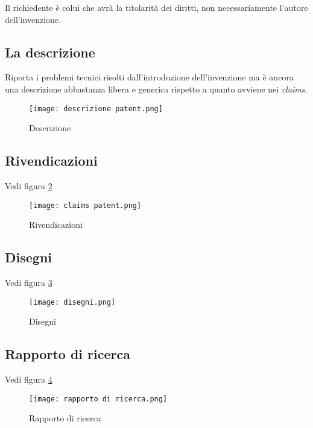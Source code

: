 Il richiedente è colui che avrà la titolarità dei diritti, non necessariamente l'autore dell'invenzione. 

\subsection{La descrizione}
Riporta i problemi tecnici risolti dall'introduzione dell'invenzione ma è ancora una descrizione abbastanza libera e generica rispetto a quanto avviene nei \textit{claims}.

\begin{figure}[!]
    \centering
    \texttt{[image: descrizione patent.png]}
    \caption{Descrizione}
    \label{descrizione}
\end{figure}

\subsection{Rivendicazioni}
Vedi figura \ref{claims}

\begin{figure}[!]
    \centering
    \texttt{[image: claims patent.png]}
    \caption{Rivendicazioni}
    \label{claims}
\end{figure}

\subsection{Disegni}
Vedi figura \ref{disegni}

\begin{figure}[!]
    \centering
    \texttt{[image: disegni.png]}
    \caption{Disegni}
    \label{disegni}
\end{figure}

\subsection{Rapporto di ricerca}
Vedi figura \ref{rapporto di ricerca}

\begin{figure}[!]
    \centering
    \texttt{[image: rapporto di ricerca.png]}
    \caption{Rapporto di ricerca}
    \label{rapporto di ricerca}
\end{figure}

